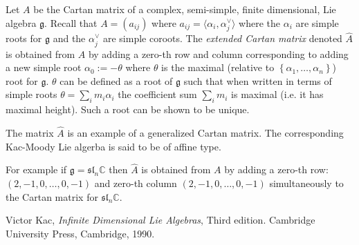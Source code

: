 \documentclass[12pt]{article}
\begin{document}
Let $A$ be the Cartan matrix of a complex, semi-simple, finite dimensional, Lie algebra $\mathfrak{g}$. Recall that $A = (a_{ij})$ where $a_{ij} = \langle \alpha_i, \alpha_j^\vee \rangle$ where the $\alpha_i$ are simple roots for $\mathfrak{g}$ and the $\alpha_j^\vee$ are simple coroots. 
The \emph{extended Cartan matrix} denoted $\hat A$ is obtained from $A$ by adding a zero-th row and column corresponding to adding a new simple root $\alpha_0 := -\theta$ where $\theta$ is the maximal (relative to $\left\{ \alpha_1,\ldots,\alpha_n \right\}$) root for $\mathfrak{g}$. $\theta$ can be defined as a root of $\mathfrak{g}$ such that when written in terms of simple roots $\theta = \sum_i m_i \alpha_i$ the coefficient sum $\sum_i m_i$ is maximal (i.e. it has maximal height). Such a root can be shown to be unique.

The matrix $\hat A$ is an example of a generalized Cartan matrix. The corresponding Kac-Moody Lie algerba is said to be of affine type.

For example if $\mathfrak{g} = \mathfrak{sl}_n \mathbb{C}$ then $\hat A$ is obtained from
$A$ by adding a zero-th row: $(2,-1,0,\ldots,0,-1)$ and zero-th column $(2,-1,0,\ldots,0,-1)$ simultaneously to the Cartan matrix for $\mathfrak{sl}_n \mathbb{C}$. 


\begin{thebibliography}{1}
Victor Kac, \emph{Infinite Dimensional Lie Algebras}, Third edition. Cambridge University Press, Cambridge, 1990.
\end{thebibliography}
\end{document}
